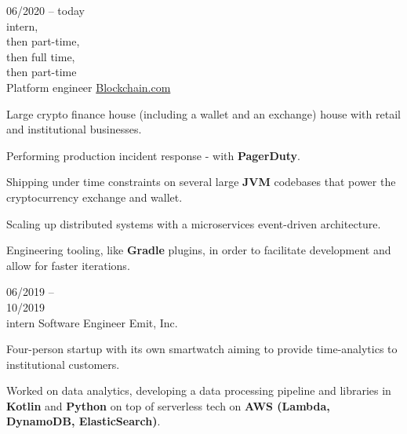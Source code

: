 \begin{entrylist}
    \entry
    {
        06/2020 -- today\\\footnotesize{intern,\\then part-time, \\then full time, \\then part-time}\\
    }
    {Platform engineer}
    {\href{https://blockchain.com/about}{Blockchain.com}}
    {
        Large crypto finance house (including a wallet and an exchange) house with retail and
    institutional businesses.

    \para
    Performing production incident response - with \textbf{PagerDuty}.

    \para
    Shipping under time constraints on several large \textbf{JVM} codebases that power the
    cryptocurrency exchange and wallet.

    \para
    Scaling up distributed systems with a microservices event-driven architecture.

    \para
    Engineering tooling, like \textbf{Gradle} plugins, in order to facilitate development
    and allow for faster iterations.
    }
    \entry
    {06/2019 -- \\ 10/2019\\\footnotesize{intern}}
    {Software Engineer}
    {Emit, Inc.}
    {
        Four-person startup with its own smartwatch aiming to provide time-analytics to
        institutional customers.

        \para
        Worked on data analytics, developing a data processing pipeline and libraries in
    \textbf{Kotlin} and \textbf{Python} on top of serverless tech on \textbf{AWS (Lambda,
        DynamoDB, ElasticSearch)}.
    }
\end{entrylist}
